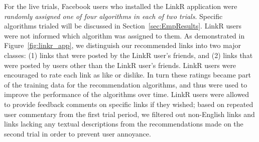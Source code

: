 For the live trials, Facebook users who installed the LinkR
application were \emph{randomly assigned one of four algorithms in
each of two trials}.  Specific algorithms trialed will be discussed in
Section~\ref{sec:EmpResults}.  LinkR users were not informed which
algorithm was assigned to them.  As demonstrated in
Figure~\ref{fig:linkr_app}, we distinguish our recommended links into
two major classes: (1) links that were posted by the LinkR user's
friends, and (2) links that were posted by users other than the LinkR
user's friends.  LinkR users were encouraged to rate each link as like
or dislike.  In turn these ratings became part of the training data
for the recommendation algorithms, and thus were used to improve the
performance of the algorithms over time.  LinkR users were allowed to
provide feedback comments on specific links if they wished; based on
repeated user commentary from the first trial period, we filtered out
non-English links and links lacking any textual descriptions from the
recommendations made on the second trial in order to prevent user
annoyance.

 